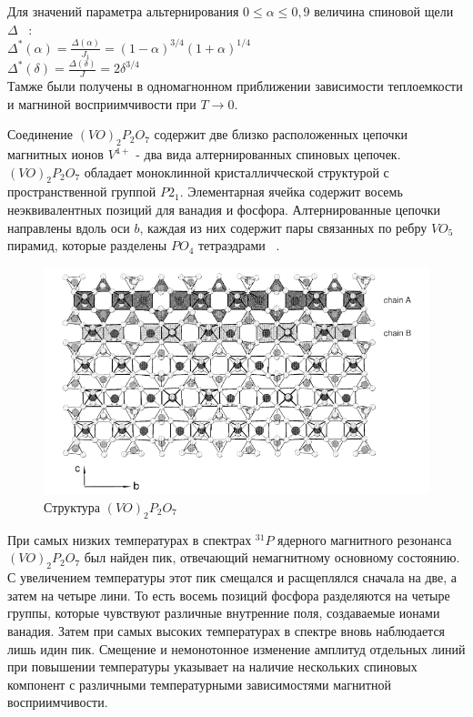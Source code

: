 \documentclass[11pt]{article}
\begin{document}
Для значений параметра альтернирования $0 \le \alpha \le 0,9$ величина спиновой щели $\Delta$ ~\cite{johnston2000}: \\

$\Delta^{*}(\alpha) = \frac{\Delta(\alpha)}{J_1} = (1-\alpha)^{3/4}(1+\alpha)^{1/4}$ \\

$\Delta^{*}(\delta) = \frac{\Delta (\delta)}{J} = 2\delta^{3/4}$ \\

Тамже были получены  в одномагнонном приближении  зависимости теплоемкости и магниной восприимчивости при $T \rightarrow 0 $.

Соединение $(VO)_2P_2O_7$ содержит две близко расположенных цепочки магнитных ионов $V^{4+}$ - два вида алтернированных спиновых цепочек. $(VO)_2P_2O_7$ обладает моноклинной кристалличческой структурой с пространственной группой $P2_1$. Элементарная ячейка содержит восемь неэквивалентных позиций для ванадия и фосфора. Алтернированные цепочки направлены вдоль оси $b$, каждая из них содержит пары связанных по ребру $VO_5$ пирамид, которые разделены $PO_4$ тетраэдрами ~\cite{nguyen1995}.

\begin{figure}[htp]
\centering
\includegraphics[scale=0.5]{VO2P2O7}
\caption {Структура $(VO)_2P_2O_7$  ~\cite{haras2002}}
\label{}
\end{figure}


При самых низких температурах в спектрах $^{31}P$ ядерного магнитного резонанса $(VO)_2P_2O_7$ был найден пик, отвечающий немагнитному основному состоянию. С увеличением температуры этот пик смещался и расщеплялся сначала на две, а затем на четыре лини. То есть восемь позиций фосфора разделяются на четыре группы, которые чувствуют различные внутренние поля, создаваемые ионами ванадия. Затем при самых высоких температурах в спектре вновь наблюдается лишь идин пик. Смещение и немонотонное изменение амплитуд отдельных линий при повышении температуры указывает на наличие нескольких спиновых компонент с различными температурными зависимостями магнитной восприимчивости. ~\cite{nm}
\end{document}
